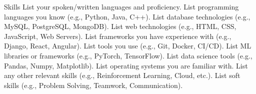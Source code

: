 
\begin{rubric}{Skills}
\entry*[Languages]
	List your spoken/written languages and proficiency.
\entry*[Coding]
	List programming languages you know (e.g., Python, Java, C++).
\entry*[Databases]
	List database technologies (e.g., MySQL, PostgreSQL, MongoDB).
	List web technologies (e.g., HTML, CSS, JavaScript, Web Servers).
\entry*[Frameworks]
	List frameworks you have experience with (e.g., Django, React, Angular).
\entry*[Tools]
	List tools you use (e.g., Git, Docker, CI/CD).
	List ML libraries or frameworks (e.g., PyTorch, TensorFlow).
	List data science tools (e.g., Pandas, Numpy, Matplotlib).
	List operating systems you are familiar with.
\entry*[Other]
	List any other relevant skills (e.g., Reinforcement Learning, Cloud, etc.).
\entry*[Soft]
	List soft skills (e.g., Problem Solving, Teamwork, Communication).
\end{rubric}
